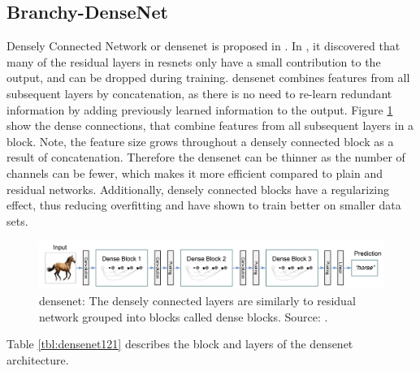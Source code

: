 \newpage\subsection{Branchy-DenseNet}

Densely Connected Network or \gls{densenet} is proposed in \cite{huang_densely_2016}. In \cite{huang_densely_2016}, it discovered that many of the residual layers in \gls{resnet}s only have a small contribution to the output, and can be dropped during training. \gls{densenet} combines features from all subsequent layers by concatenation, as there is no need to re-learn redundant information by adding previously learned information to the output. Figure \ref{fig:densenet} show the dense connections, that combine features from all subsequent layers in a block. Note, the feature size grows throughout a densely connected block as a result of concatenation. Therefore the \gls{densenet} can be thinner as the number of channels can be fewer, which makes it more efficient compared to plain and residual networks. Additionally, densely connected blocks have a regularizing effect, thus reducing overfitting and have shown to train better on smaller data sets.

\begin{figure}
	\centering
	\includegraphics[width=\linewidth]{figures/models/densenet}
	\caption[\gls{densenet}]{\gls{densenet}: The densely connected layers are similarly to residual network grouped into blocks called dense blocks. Source:  \cite{huang_densely_2016}.}
	\label{fig:densenet}
\end{figure}

Table \ref{tbl:densenet121} describes the block and layers of the \gls{densenet} architecture. 


